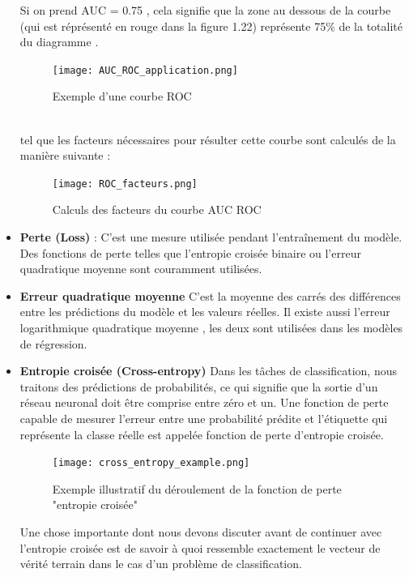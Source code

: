 \begin{itemize}[label=$\bullet$]
Si on prend AUC = 0.75 , cela signifie que la zone au dessous de la courbe (qui est réprésenté en rouge dans la figure 1.22) représente 75\% de la totalité du diagramme .
    \begin{figure}[htbp]
    \centering
    \texttt{[image: AUC\_ROC\_application.png]}
    \caption{Exemple d'une courbe ROC}\cite{classification_metrics_auc_roc}
    \label{fig:example24}
    \end{figure}
    \\
    tel que les facteurs nécessaires pour résulter cette courbe sont calculés de la manière suivante : \\
    \begin{figure}[htbp]
    \centering
    \texttt{[image: ROC\_facteurs.png]}
    \caption{Calculs des facteurs du courbe AUC ROC\cite{important_model_evaluation_error_metrics}}
    \label{fig:example25}
    \end{figure}

    
\item \textbf{Perte (Loss)} : C'est une mesure utilisée pendant l’entraînement du modèle. Des fonctions de perte telles que l’entropie croisée binaire ou l’erreur quadratique moyenne sont couramment utilisées.


\item \textbf{Erreur quadratique moyenne}
C'est la moyenne des carrés des différences entre les prédictions du modèle et les valeurs réelles. Il existe aussi l'erreur logarithmique quadratique moyenne , les deux sont utilisées dans les modèles de régression.

\item \textbf{Entropie croisée (Cross-entropy)}
Dans les tâches de classification, nous traitons des prédictions de probabilités, ce qui signifie que la sortie d'un réseau neuronal doit être comprise entre zéro et un. Une fonction de perte capable de mesurer l'erreur entre une probabilité prédite et l'étiquette qui représente la classe réelle est appelée fonction de perte d'entropie croisée.
\begin{figure}[htbp]
    \centering
    \texttt{[image: cross\_entropy\_example.png]}
    \caption{Exemple illustratif du déroulement de la fonction de perte "entropie croisée"\cite{cross_entropy_loss}}
    \label{fig:example26}
    \end{figure}
Une chose importante dont nous devons discuter avant de continuer avec l'entropie croisée est de savoir à quoi ressemble exactement le vecteur de vérité terrain dans le cas d'un problème de classification.


\end{itemize}
